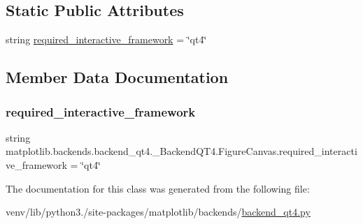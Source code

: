 \subsection*{Static Public Attributes}
\begin{DoxyCompactItemize}
\item 
string \hyperlink{classmatplotlib_1_1backends_1_1backend__qt4_1_1__BackendQT4_1_1FigureCanvas_a996afb9d34153020e1c9a8605b92a67a}{required\+\_\+interactive\+\_\+framework} = \char`\"{}qt4\char`\"{}
\end{DoxyCompactItemize}


\subsection{Member Data Documentation}
\mbox{\label{classmatplotlib_1_1backends_1_1backend__qt4_1_1__BackendQT4_1_1FigureCanvas_a996afb9d34153020e1c9a8605b92a67a}} 
\subsubsection{\texorpdfstring{required\+\_\+interactive\+\_\+framework}{required\_interactive\_framework}}
{\footnotesize\ttfamily string matplotlib.\+backends.\+backend\+\_\+qt4.\+\_\+\+Backend\+Q\+T4.\+Figure\+Canvas.\+required\+\_\+interactive\+\_\+framework = \char`\"{}qt4\char`\"{}\hspace{0.3cm}{\ttfamily [static]}}



The documentation for this class was generated from the following file\+:\begin{DoxyCompactItemize}
\item 
venv/lib/python3./site-\/packages/matplotlib/backends/\hyperlink{backend__qt4_8py}{backend\+\_\+qt4.\+py}\end{DoxyCompactItemize}
